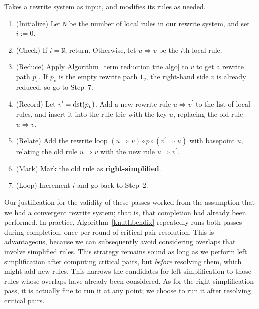 \documentclass[../generics]{subfiles}
\begin{document}
\begin{algorithm}\label{right simplification}
Takes a rewrite system as input, and modifies its rules as needed.
\begin{enumerate}
\item (Initialize) Let \texttt{N} be the number of local rules in our rewrite system, and set $i:=0$.
\item (Check) If $i=\texttt{N}$, return. Otherwise, let $u\Rightarrow v$ be the $i$th local rule.
\item (Reduce) Apply Algorithm~\ref{term reduction trie algo} to $v$ to get a rewrite path $p_v$. If $p_v$ is the empty rewrite path $1_{v}$, the right-hand side $v$ is already reduced, so go to Step~7.
\item (Record) Let $v^\prime=\operatorname{dst}(p_v)$. Add a new rewrite rule $u\Rightarrow v^\prime$ to the list of local rules, and insert it into the rule trie with the key $u$, replacing the old rule $u\Rightarrow v$.
\item (Relate) Add the rewrite loop $(u\Rightarrow v)\circ p\circ(v^\prime\Rightarrow u)$ with basepoint $u$, relating the old rule $u\Rightarrow v$ with the new rule $u\Rightarrow v^\prime$.
\item (Mark) Mark the old rule as \textbf{right-simplified}.
\item (Loop) Increment $i$ and go back to Step~2.
\end{enumerate}
\end{algorithm}

Our justification for the validity of these passes worked from the assumption that we had a convergent rewrite system; that is, that completion had already been performed. In practice, Algorithm~\ref{knuthbendix} repeatedly runs both passes during completion, once per round of critical pair resolution. This is advantageous, because we can subsequently avoid considering overlaps that involve simplified rules. This strategy remains sound as long as we perform left simplification after computing critical pairs, but \emph{before} resolving them, which might add new rules. This narrows the candidates for left simplification to those rules whose overlaps have already been considered. As for the right simplification pass, it is actually fine to run it at any point; we choose to run it after resolving critical pairs.
\end{document}
